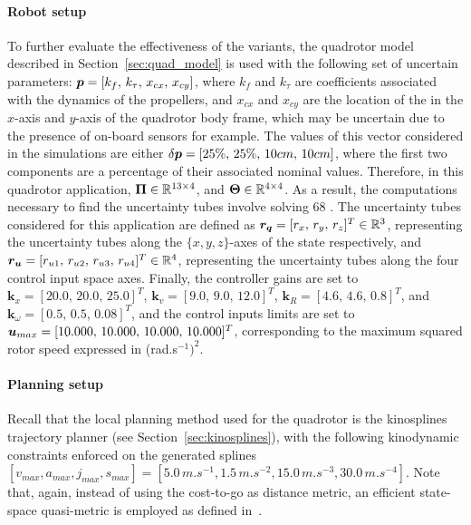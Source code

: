 \paragraph{Robot setup}

To further evaluate the effectiveness of the  variants, the quadrotor model described in Section~\ref{sec:quad_model} is used with the following set of uncertain parameters: $\boldsymbol{p} = [k_{f}, \, k_{\tau}, \, x_{cx}, \, x_{cy}]$, where $k_{f}$ and $k_{\tau}$ are coefficients associated with the dynamics of the propellers, and $x_{cx}$ and $x_{cy}$ are the location of the  in the $x$-axis and $y$-axis of the quadrotor body frame, which may be uncertain due to the presence of on-board sensors for example.
The values of this vector considered in the simulations are either $\delta\boldsymbol{p} = [25\%, \, 25\%, \, 10cm, \, 10cm]$, where the first two components are a percentage of their associated nominal values. 
Therefore, in this quadrotor application, $\boldsymbol{\Pi} \in \mathbb{R}^{13\times4}$, and $\boldsymbol{\Theta} \in \mathbb{R}^{4\times4}$.
As a result, the computations necessary to find the uncertainty tubes involve solving 68 .
The uncertainty tubes considered for this application are defined as $\boldsymbol{r_q} = [r_x, \, r_y, \, r_z]^T \in \mathbb{R}^3$, representing the uncertainty tubes along the $\{x,y,z\}$-axes of the state respectively, and $\boldsymbol{r_u} = [r_{u1}, \, r_{u2}, \, r_{u3}, \, r_{u4}]^T \in \mathbb{R}^4$, representing the uncertainty tubes along the four control input space axes.
Finally, the controller gains are set to $\boldsymbol{k}_{x} = [20.0, \, 20.0, \, 25.0]^T$, $\boldsymbol{k}_{v}= [9.0, \, 9.0, \, 12.0]^T$, $\boldsymbol{k}_{R}=[4.6, \, 4.6, \, 0.8]^T$, and $\boldsymbol{k}_{\omega}=[0.5, \, 0.5, \, 0.08]^T$, and the control inputs limits are set to $\boldsymbol{u}_{max} = [10.000, \, 10.000, \, 10.000, \, 10.000]^T$, corresponding to the maximum squared rotor speed expressed in (rad.s$^{-1})^2$.

\paragraph{Planning setup}

Recall that the local planning method used for the quadrotor is the kinosplines trajectory planner (see Section~\ref{sec:kinosplines}), with the following kinodynamic constraints enforced on the generated splines $[v_{max}, a_{max}, j_{max}, s_{max}] = [5.0 \, m.s^{-1}, \allowbreak 1.5 \, m.s^{-2}, \allowbreak 15.0 \, m.s^{-3}, \allowbreak 30.0 \, m.s^{-4}]$. 
Note that, again, instead of using the cost-to-go as distance metric, an efficient state-space quasi-metric is employed as defined in~\cite{cKino}.

